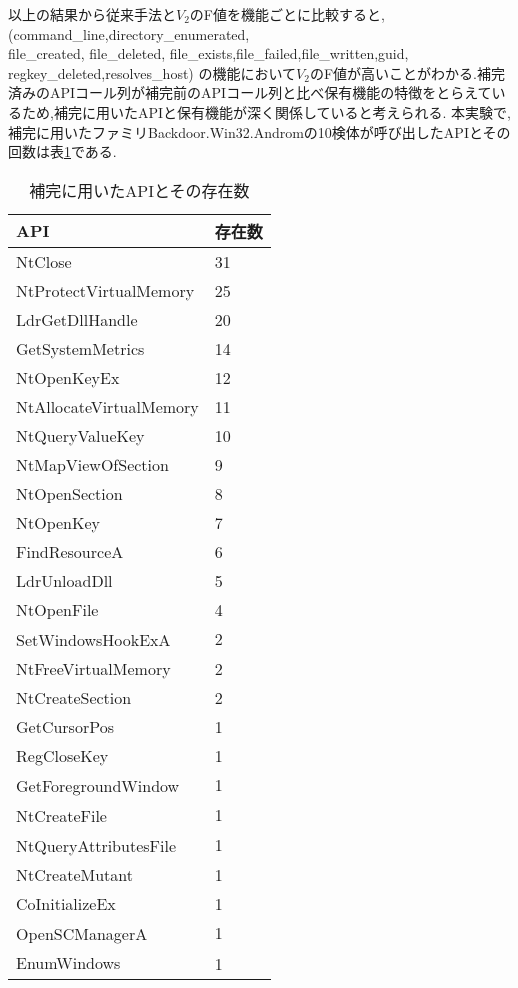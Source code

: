\documentclass{thesis}
\begin{document}
以上の結果から従来手法と$V_2$のF値を機能ごとに比較すると,
(command\_line,directory\_enumerated,\\ file\_created, 
file\_deleted, file\_exists,file\_failed,file\_written,guid, regkey\_deleted,resolves\_host)
の機能において$V_2$のF値が高いことがわかる.補完済みのAPIコール列が補完前のAPIコール列と比べ保有機能の特徴をとらえているため,補完に用いたAPIと保有機能が深く関係していると考えられる.
本実験で,補完に用いたファミリBackdoor.Win32.Andromの10検体が呼び出したAPIとその回数は表\ref{table:complete}である.
\begin{table}[H]
	\caption{補完に用いたAPIとその存在数}
	\label{table:complete}
	\begin{center}
		\begin{tabular}{|l|p{20mm}|} \hline 
			API & 存在数  \\ \hline\hline
			NtClose & 31 \\ \hline
			NtProtectVirtualMemory & 25 \\ \hline
			LdrGetDllHandle & 20 \\ \hline
			GetSystemMetrics & 14 \\ \hline
			NtOpenKeyEx &12  \\ \hline			
			NtAllocateVirtualMemory & 11 \\ \hline
			NtQueryValueKey & 10 \\ \hline
			NtMapViewOfSection &9  \\ \hline
			NtOpenSection & 8 \\ \hline
			NtOpenKey &7  \\ \hline
			FindResourceA &6  \\ \hline
			LdrUnloadDll &5  \\ \hline
			NtOpenFile &4  \\ \hline
                   SetWindowsHookExA　&2  \\ \hline
                  NtFreeVirtualMemory &2  \\ \hline
                  NtCreateSection &2  \\ \hline
                   GetCursorPos &1  \\ \hline
                  RegCloseKey &1  \\ \hline
                  GetForegroundWindow　 & 1 \\ \hline 
                  NtCreateFile　 &1  \\ \hline
                  NtQueryAttributesFile　 & 1 \\ \hline
                 NtCreateMutant &1  \\ \hline
                   CoInitializeEx &1  \\ \hline
                  OpenSCManagerA　 &1  \\ \hline
                 EnumWindows&1 　　\\ \hline
		\end{tabular}
	\end{center}
\end{table}
\end{document}
